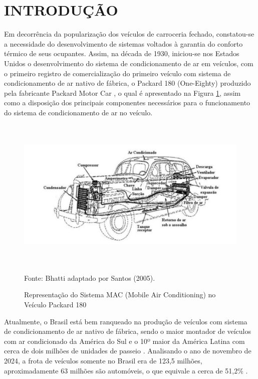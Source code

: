 \section{INTRODUÇÃO}

Em decorrência da popularização dos veículos de carroceria fechado, constatou-se a necessidade do desenvolvimento de sistemas voltados à garantia do conforto térmico de seus ocupantes. 
Assim, na década de 1930, iniciou-se nos Estados Unidos o desenvolvimento do sistema de condicionamento de ar em veículos, com o primeiro registro de comercialização do primeiro veículo com sistema de condicionamento de ar nativo de fábrica, o Packard 180 (One-Eighty) produzido pela fabricante Packard Motor Car \cite{bhatti1999}, o qual é apresentado na Figura \ref{fig:sistemaMAC}, assim como a disposição dos principais componentes necessários para o funcionamento do sistema de condicionamento de ar no veículo.
\\

\begin{figure}[h]
    \centering
    
    \caption{ Representação do Sistema MAC (Mobile Air Conditioning) no Veículo Packard 180}
    
    \includegraphics[width=15.65cm, height=7.35cm]{FigurasdoTexto/sistemaMAC.png}
    
     \vspace{5pt}  %
    {\footnotesize Fonte: Bhatti adaptado por Santos (2005).}  %
    \label{fig:sistemaMAC}
\end{figure}

Atualmente, o Brasil está bem ranqueado na produção de veículos com sistema de condicionamento de ar nativo de fábrica, sendo o maior montador de veículos com ar condicionado da América do Sul e o 10º maior da América Latina com cerca de dois milhões de unidades de passeio \cite{dasilva2024}. Analisando o ano de novembro de 2024, a frota de veículos somente no Brasil era de 123,5 milhões, aproximadamente 63 milhões são automóveis, o que equivale a cerca de 51,2\%  \cite{ministerio2024}.

